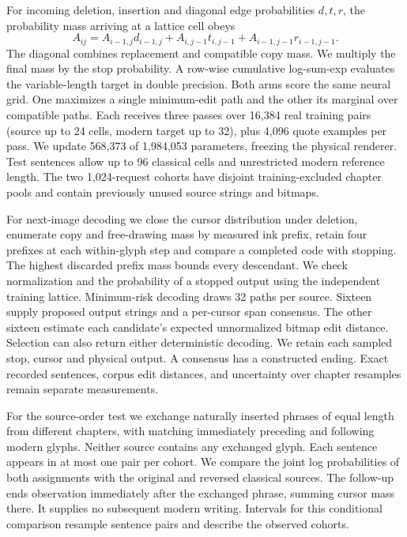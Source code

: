 \documentclass[12pt,a4paper]{article}
\providecommand{\DIFadd}[1]{{\protect\color{blue} \sf #1}} %
\begin{document}
\DIFadd{For incoming deletion, insertion and diagonal edge probabilities $d,t,r$, the probability mass arriving at a lattice cell obeys
}\[
 A_{ij}=A_{i-1,j}d_{i-1,j}+A_{i,j-1}t_{i,j-1}+A_{i-1,j-1}r_{i-1,j-1}.
\]
\DIFadd{The diagonal combines replacement and compatible copy mass. We multiply the final mass by the stop probability. A row-wise cumulative log-sum-exp evaluates the variable-length target in double precision. Both arms score the same neural grid. One maximizes a single minimum-edit path and the other its marginal over compatible paths. Each receives three passes over 16,384 real training pairs (source up to 24 cells, modern target up to 32), plus 4,096 quote examples per pass. We update 568,373 of 1,984,053 parameters, freezing the physical renderer. Test sentences allow up to 96 classical cells and unrestricted modern reference length. The two 1,024-request cohorts have disjoint training-excluded chapter pools and contain previously unused source strings and bitmaps.
}

\DIFadd{For next-image decoding we close the cursor distribution under deletion, enumerate copy and free-drawing mass by measured ink prefix, retain four prefixes at each within-glyph step and compare a completed code with stopping. The highest discarded prefix mass bounds every descendant. We check normalization and the probability of a stopped output using the independent training lattice. Minimum-risk decoding draws 32 paths per source. Sixteen supply proposed output strings and a per-cursor span consensus. The other sixteen estimate each candidate's expected unnormalized bitmap edit distance. Selection can also return either deterministic decoding. We retain each sampled stop, cursor and physical output. A consensus has a constructed ending. Exact recorded sentences, corpus edit distances, and uncertainty over chapter resamples remain separate measurements.
}

\DIFadd{For the source-order test we exchange naturally inserted phrases of equal length from different chapters, with matching immediately preceding and following modern glyphs. Neither source contains any exchanged glyph. Each sentence appears in at most one pair per cohort. We compare the joint log probabilities of both assignments with the original and reversed classical sources. The follow-up ends observation immediately after the exchanged phrase, summing cursor mass there. It supplies no subsequent modern writing. Intervals for this conditional comparison resample sentence pairs and describe the observed cohorts.
}
\end{document}
